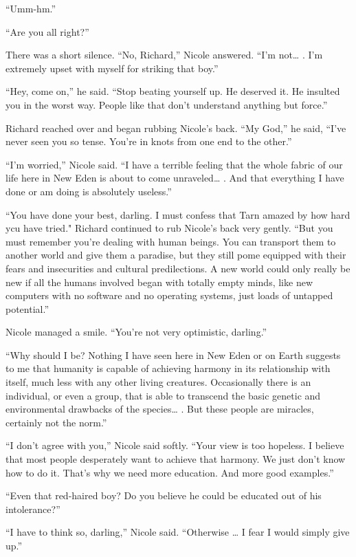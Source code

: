 \documentclass[]{article}
\begin{document}
{“Umm-hm.”

“Are you all right?”

There was a short silence.  “No, Richard,” Nicole answered.  “I’m not… .  I’m extremely upset with myself for striking that boy.”

“Hey, come on,” he said.  “Stop beating yourself up.  He deserved it.  He insulted you in the worst way.  People like that don’t understand anything but force.”

Richard reached over and began rubbing Nicole’s back.  “My God,” he said, “I’ve never seen you so tense.  You’re in knots from one end to the other.”

“I’m worried,” Nicole said.  “I have a terrible feeling that the whole fabric of our life here in New Eden is about to come unraveled… .  And that everything I have done or am doing is absolutely useless.”

“You have done your best, darling.  I must confess that Tarn amazed by how hard ycu have tried."  Richard continued to rub Nicole’s back very gently.  “But you must remember you’re dealing with human beings.  You can transport them to another world and give them a paradise, but they still pome equipped with their fears and insecurities and cultural predilections.  A new world could only really be new if all the humans involved began with totally empty minds, like new computers with no software and no operating systems, just loads of untapped potential.”

Nicole managed a smile.  “You’re not very optimistic, darling.”

“Why should I be? Nothing I have seen here in New Eden or on Earth suggests to me that humanity is capable of achieving harmony in its relationship with itself, much less with any other living creatures.  Occasionally there is an individual, or even a group, that is able to transcend the basic genetic and environmental drawbacks of the species… .  But these people are miracles, certainly not the norm.”

“I don’t agree with you,” Nicole said softly.  “Your view is too hopeless.  I believe that most people desperately want to achieve that harmony.  We just don’t know how to do it.  That’s why we need more education.  And more good examples.”

“Even that red-haired boy? Do you believe he could be educated out of his intolerance?”

“I have to think so, darling,” Nicole said.  “Otherwise … I fear I would simply give up.”

}
\end{document}
